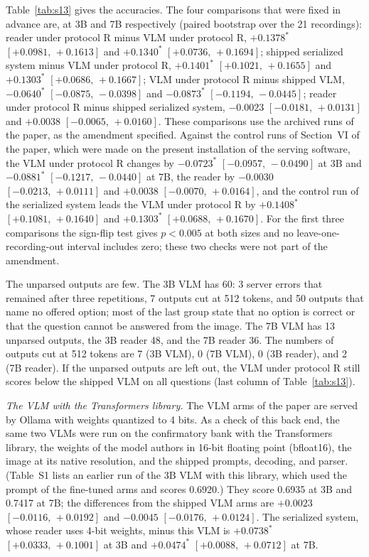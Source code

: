 \documentclass[10pt]{article}
\begin{document}
Table~\ref{tab:s13} gives the accuracies. The four comparisons that were fixed in advance are, at 3B and 7B respectively (paired bootstrap over the 21 recordings): reader under protocol R minus VLM under protocol R, $+0.1378^{*}$ $[+0.0981,\,+0.1613]$ and $+0.1340^{*}$ $[+0.0736,\,+0.1694]$; shipped serialized system minus VLM under protocol R, $+0.1401^{*}$ $[+0.1021,\,+0.1655]$ and $+0.1303^{*}$ $[+0.0686,\,+0.1667]$; VLM under protocol R minus shipped VLM, $-0.0640^{*}$ $[-0.0875,\,-0.0398]$ and $-0.0873^{*}$ $[-0.1194,\,-0.0445]$; reader under protocol R minus shipped serialized system, $-0.0023$ $[-0.0181,\,+0.0131]$ and $+0.0038$ $[-0.0065,\,+0.0160]$. These comparisons use the archived runs of the paper, as the amendment specified. Against the control runs of Section~VI of the paper, which were made on the present installation of the serving software, the VLM under protocol R changes by $-0.0723^{*}$ $[-0.0957,\,-0.0490]$ at 3B and $-0.0881^{*}$ $[-0.1217,\,-0.0440]$ at 7B, the reader by $-0.0030$ $[-0.0213,\,+0.0111]$ and $+0.0038$ $[-0.0070,\,+0.0164]$, and the control run of the serialized system leads the VLM under protocol R by $+0.1408^{*}$ $[+0.1081,\,+0.1640]$ and $+0.1303^{*}$ $[+0.0688,\,+0.1670]$. For the first three comparisons the sign-flip test gives $p<0.005$ at both sizes and no leave-one-recording-out interval includes zero; these two checks were not part of the amendment.

The unparsed outputs are few. The 3B VLM has 60: 3 server errors that remained after three repetitions, 7 outputs cut at 512 tokens, and 50 outputs that name no offered option; most of the last group state that no option is correct or that the question cannot be answered from the image. The 7B VLM has 13 unparsed outputs, the 3B reader 48, and the 7B reader 36. The numbers of outputs cut at 512 tokens are 7 (3B VLM), 0 (7B VLM), 0 (3B reader), and 2 (7B reader). If the unparsed outputs are left out, the VLM under protocol R still scores below the shipped VLM on all questions (last column of Table~\ref{tab:s13}).

\emph{The VLM with the Transformers library.} The VLM arms of the paper are served by Ollama with weights quantized to 4 bits. As a check of this back end, the same two VLMs were run on the confirmatory bank with the Transformers library, the weights of the model authors in 16-bit floating point (bfloat16), the image at its native resolution, and the shipped prompts, decoding, and parser. (Table~S1 lists an earlier run of the 3B VLM with this library, which used the prompt of the fine-tuned arms and scores $0.6920$.) They score 0.6935 at 3B and 0.7417 at 7B; the differences from the shipped VLM arms are $+0.0023$ $[-0.0116,\,+0.0192]$ and $-0.0045$ $[-0.0176,\,+0.0124]$. The serialized system, whose reader uses 4-bit weights, minus this VLM is $+0.0738^{*}$ $[+0.0333,\,+0.1001]$ at 3B and $+0.0474^{*}$ $[+0.0088,\,+0.0712]$ at 7B.
\end{document}
